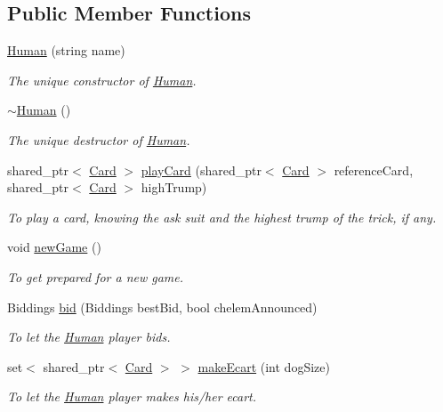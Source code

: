 \subsection*{\-Public \-Member \-Functions}
\begin{DoxyCompactItemize}
\item 
\hyperlink{classHuman_a8041607e0500c6858c9453b903d5b076}{\-Human} (string name)
\begin{DoxyCompactList}\small\item\em \-The unique constructor of \hyperlink{classHuman}{\-Human}. \end{DoxyCompactList}\item 
\hypertarget{classHuman_a93ca0fbf9e5b5bcb6f2f72eeb450219b}{\hyperlink{classHuman_a93ca0fbf9e5b5bcb6f2f72eeb450219b}{$\sim$\-Human} ()}\label{classHuman_a93ca0fbf9e5b5bcb6f2f72eeb450219b}

\begin{DoxyCompactList}\small\item\em \-The unique destructor of \hyperlink{classHuman}{\-Human}. \end{DoxyCompactList}\item 
shared\-\_\-ptr$<$ \hyperlink{classCard}{\-Card} $>$ \hyperlink{classHuman_a3258d3ce0eec7a5e393c639506ef28e5}{play\-Card} (shared\-\_\-ptr$<$ \hyperlink{classCard}{\-Card} $>$ reference\-Card, shared\-\_\-ptr$<$ \hyperlink{classCard}{\-Card} $>$ high\-Trump)
\begin{DoxyCompactList}\small\item\em \-To play a card, knowing the ask suit and the highest trump of the trick, if any. \end{DoxyCompactList}\item 
\hypertarget{classHuman_aae5efb6945fdbcda9c9a4d9e72d4a60e}{void \hyperlink{classHuman_aae5efb6945fdbcda9c9a4d9e72d4a60e}{new\-Game} ()}\label{classHuman_aae5efb6945fdbcda9c9a4d9e72d4a60e}

\begin{DoxyCompactList}\small\item\em \-To get prepared for a new game. \end{DoxyCompactList}\item 
\-Biddings \hyperlink{classHuman_aebbb26f8477fa2234bfa23d153a1bf0b}{bid} (\-Biddings best\-Bid, bool chelem\-Announced)
\begin{DoxyCompactList}\small\item\em \-To let the \hyperlink{classHuman}{\-Human} player bids. \end{DoxyCompactList}\item 
set$<$ shared\-\_\-ptr$<$ \hyperlink{classCard}{\-Card} $>$ $>$ \hyperlink{classHuman_accfa928e35d3ff981b7acb5e351eaeb5}{make\-Ecart} (int dog\-Size)
\begin{DoxyCompactList}\small\item\em \-To let the \hyperlink{classHuman}{\-Human} player makes his/her ecart. \end{DoxyCompactList}\end{DoxyCompactItemize}


